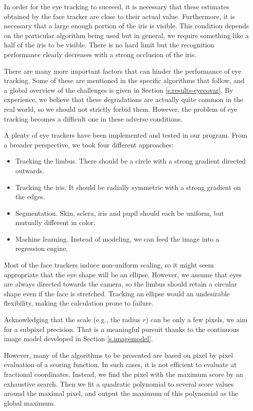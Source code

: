 In order for the eye tracking to succeed, it is necessary that these estimates obtained by the face tracker are close to their actual value.
Furthermore, it is necessary that a large enough portion of the iris is visible.
This condition depends on the particular algorithm being used but in general, we require something like a half of the iris to be visible.
There is no hard limit but the recognition performance clearly decreases with a strong occlusion of the iris.

There are many more important factors that can hinder the performance of eye tracking.
Some of these are mentioned in the specific algorithms that follow, and a global overview of the challenges is given in Section \ref{s:results-eyecovar}.
By experience, we believe that these degradations are actually quite common in the real world, so we should not strictly forbid them.
However, the problem of eye tracking becomes a difficult one in these adverse conditions.

A plenty of eye trackers have been implemented and tested in our program.
From a broader perspective, we took four different approaches:
\begin{itemize}
\item Tracking the limbus. There should be a circle with a strong gradient directed outwards.
\item Tracking the iris. It should be radially symmetric with a strong gradient on the edges.
\item Segmentation. Skin, sclera, iris and pupil should each be uniform, but mutually different in color.
\item Machine learning. Instead of modeling, we can feed the image into a regression engine.
\end{itemize}

Most of the face trackers induce non-uniform scaling, so it might seem appropriate that the eye shape will be an ellipse.
However, we assume that eyes are always directed towards the camera, so the limbus should retain a circular shape even if the face is stretched.
Tracking an ellipse would an undesirable flexibility, making the calculation prone to failure.

Acknowledging that the scale (e.g., the radius $r$) can be only a few pixels, we aim for a subpixel precision.
That is a meaningful pursuit thanks to the continuous image model developed in Section \ref{s.imagemodel}.

However, many of the algorithms to be presented are based on pixel by pixel evaluation of a scoring function.
In such cases, it is not efficient to evaluate at fractional coordinates.
Instead, we find the pixel with the maximum score by an exhaustive search.
Then we fit a quadratic polynomial to several score values around the maximal pixel, and output the maximum of this polynomial as the global maximum.


